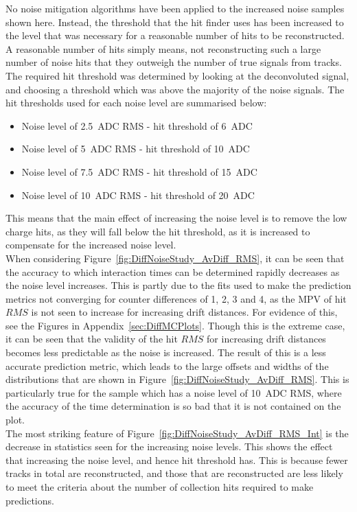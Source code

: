 No noise mitigation algorithms have been applied to the increased noise samples shown here. Instead, the threshold that the hit finder uses has been increased to the level that was necessary for a reasonable number of hits to be reconstructed. A reasonable number of hits simply means, not reconstructing such a large number of noise hits that they outweigh the number of true signals from tracks. The required hit threshold was determined by looking at the deconvoluted signal, and choosing a threshold which was above the majority of the noise signals. The hit thresholds used for each noise level are summarised below:
\begin{itemize}
\item Noise level of 2.5~ADC RMS - hit threshold of 6~ADC
\item Noise level of 5~ADC RMS - hit threshold of 10~ADC
\item Noise level of 7.5~ADC RMS - hit threshold of 15~ADC
\item Noise level of 10~ADC RMS - hit threshold of 20~ADC
\end{itemize}
This means that the main effect of increasing the noise level is to remove the low charge hits, as they will fall below the hit threshold, as it is increased to compensate for the increased noise level. \\

When considering Figure~\ref{fig:DiffNoiseStudy_AvDiff_RMS}, it can be seen that the accuracy to which interaction times can be determined rapidly decreases as the noise level increases. This is partly due to the fits used to make the prediction metrics not converging for counter differences of 1, 2, 3 and 4, as the MPV of hit $RMS$ is not seen to increase for increasing drift distances. For evidence of this, see the Figures in Appendix~\ref{sec:DiffMCPlots}. Though this is the extreme case, it can be seen that the validity of the hit $RMS$ for increasing drift distances becomes less predictable as the noise is increased. The result of this is a less accurate prediction metric, which leads to the large offsets and widths of the distributions that are shown in Figure~\ref{fig:DiffNoiseStudy_AvDiff_RMS}. This is particularly true for the sample which has a noise level of 10~ADC RMS, where the accuracy of the time determination is so bad that it is not contained on the plot. \\

The most striking feature of Figure~\ref{fig:DiffNoiseStudy_AvDiff_RMS_Int} is the decrease in statistics seen for the increasing noise levels. This shows the effect that increasing the noise level, and hence hit threshold has. This is because fewer tracks in total are reconstructed, and those that are reconstructed are less likely to meet the criteria about the number of collection hits required to make predictions. \\

